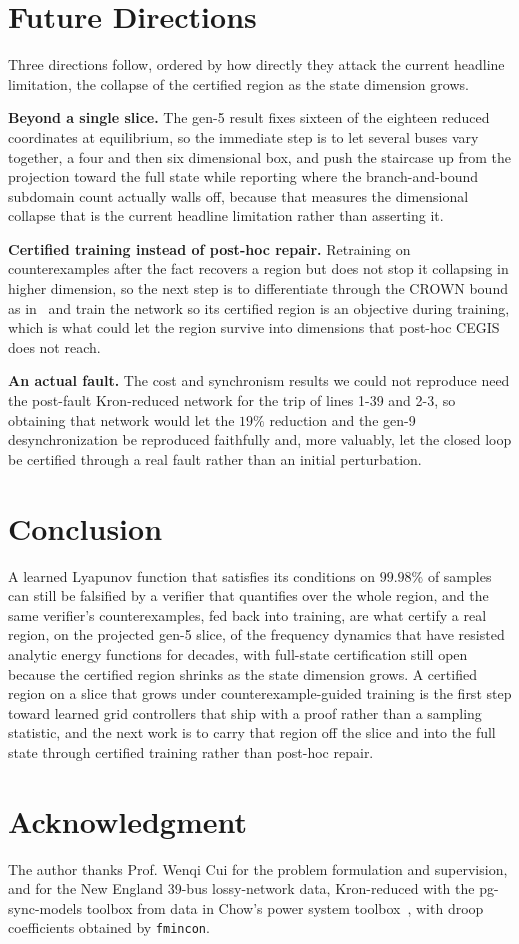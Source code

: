 \documentclass[letterpaper,journal]{IEEEtran}
\begin{document}
\section{Future Directions}
Three directions follow, ordered by how directly they attack the current headline
limitation, the collapse of the certified region as the state dimension grows.

\textbf{Beyond a single slice.} The gen-5 result fixes sixteen of the eighteen
reduced coordinates at equilibrium, so the immediate step is to let several buses
vary together, a four and then six dimensional box, and push the staircase up from
the projection toward the full state while reporting where the branch-and-bound
subdomain count actually walls off, because that measures the dimensional collapse
that is the current headline limitation rather than asserting it.

\textbf{Certified training instead of post-hoc repair.} Retraining on
counterexamples after the fact recovers a region but does not stop it collapsing in
higher dimension, so the next step is to differentiate through the CROWN bound as
in~\cite{shi2024certified} and train the network so its certified region is an
objective during training, which is what could let the region survive into
dimensions that post-hoc CEGIS does not reach.

\textbf{An actual fault.} The cost and synchronism results we could not reproduce
need the post-fault Kron-reduced network for the trip of lines 1-39 and 2-3, so
obtaining that network would let the $19\%$ reduction and the gen-9 desynchronization
be reproduced faithfully and, more valuably, let the closed loop be certified
through a real fault rather than an initial perturbation.

\section{Conclusion}
A learned Lyapunov function that satisfies its conditions on $99.98\%$ of samples
can still be falsified by a verifier that quantifies over the whole region, and
the same verifier's counterexamples, fed back into training, are what certify a
real region, on the projected gen-5 slice, of the frequency dynamics that have
resisted analytic energy functions for decades, with full-state certification still
open because the certified region shrinks as the state dimension grows. A certified
region on a slice that grows under counterexample-guided training is the first step
toward learned grid controllers that ship with a proof rather than a sampling
statistic, and the next work is to carry that region off the slice and into the
full state through certified training rather than post-hoc repair.

\section*{Acknowledgment}
The author thanks Prof. Wenqi Cui for the problem formulation and supervision, and
for the New England 39-bus lossy-network data, Kron-reduced with the pg-sync-models
toolbox from data in Chow's power system toolbox~\cite{chow1992toolbox}, with droop
coefficients obtained by \texttt{fmincon}.



\end{document}
